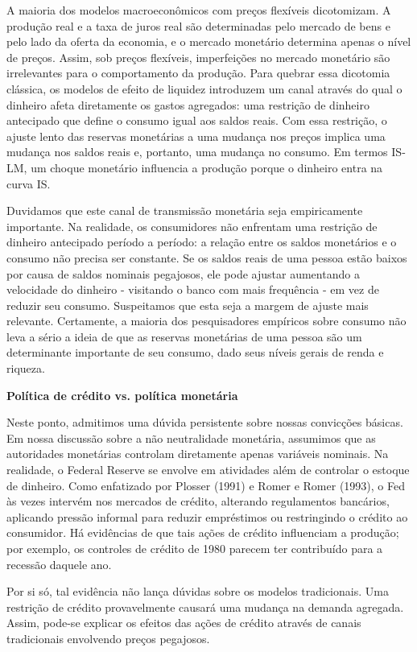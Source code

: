\documentclass[12pt]{article}
\begin{document}
A maioria dos modelos macroeconômicos com preços flexíveis dicotomizam. A produção real e a taxa de juros real são determinadas pelo mercado de bens e pelo lado da oferta da economia, e o mercado monetário determina apenas o nível de preços. Assim, sob preços flexíveis, imperfeições no mercado monetário são irrelevantes para o comportamento da produção. Para quebrar essa dicotomia clássica, os modelos de efeito de liquidez introduzem um canal através do qual o dinheiro afeta diretamente os gastos agregados: uma restrição de dinheiro antecipado que define o consumo igual aos saldos reais. Com essa restrição, o ajuste lento das reservas monetárias a uma mudança nos preços implica uma mudança nos saldos reais e, portanto, uma mudança no consumo. Em termos IS-LM, um choque monetário influencia a produção porque o dinheiro entra na curva IS.

Duvidamos que este canal de transmissão monetária seja empiricamente importante. Na realidade, os consumidores não enfrentam uma restrição de dinheiro antecipado período a período: a relação entre os saldos monetários e o consumo não precisa ser constante.
Se os saldos reais de uma pessoa estão baixos por causa de saldos nominais pegajosos, ele pode ajustar aumentando a velocidade do dinheiro - visitando o banco com mais frequência - em vez de reduzir seu consumo. Suspeitamos que esta seja a margem de ajuste mais relevante. Certamente, a maioria dos pesquisadores empíricos sobre consumo não leva a sério a ideia de que as reservas monetárias de uma pessoa são um determinante importante de seu consumo, dado seus níveis gerais de renda e riqueza.

\textbf{Política de crédito vs. política monetária}

Neste ponto, admitimos uma dúvida persistente sobre nossas convicções básicas. Em nossa discussão sobre a não neutralidade monetária, assumimos que as autoridades monetárias controlam diretamente apenas variáveis nominais. Na realidade, o Federal Reserve se envolve em atividades além de controlar o estoque de dinheiro. Como enfatizado por Plosser (1991) e Romer e Romer (1993), o Fed às vezes intervém nos mercados de crédito, alterando regulamentos bancários, aplicando pressão informal para reduzir empréstimos ou restringindo o crédito ao consumidor. Há evidências de que tais ações de crédito influenciam a produção; por exemplo, os controles de crédito de 1980 parecem ter contribuído para a recessão daquele ano.

Por si só, tal evidência não lança dúvidas sobre os modelos tradicionais. Uma restrição de crédito provavelmente causará uma mudança na demanda agregada. Assim, pode-se explicar os efeitos das ações de crédito através de canais tradicionais envolvendo preços pegajosos.
\end{document}
